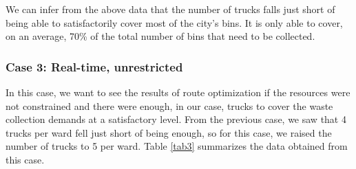 \documentclass[12pt]{article}
\begin{document}
We can infer from the above data that the number of trucks falls just short of being able to satisfactorily cover most of the city's bins. It is only able to cover, on an average, 70\% of the total number of bins that need to be collected.

\subsubsection*{Case 3: Real-time, unrestricted}

In this case, we want to see the results of route optimization if the resources were not constrained and there were enough, in our case, trucks to cover the waste collection demands at a satisfactory level. From the previous case, we saw that 4 trucks per ward fell just short of being enough, so for this case, we raised the number of trucks to 5 per ward. Table \ref{tab3} summarizes the data obtained from this case.
\end{document}
